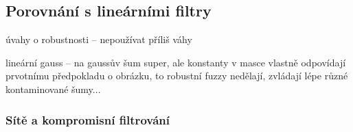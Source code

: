         
    \subsection{Porovnání s lineárními filtry}
    
        úvahy o robustnosti -- nepoužívat příliš váhy
        
        lineární gauss -- na gaussův šum super, ale konstanty v masce vlastně odpovídají prvotnímu předpokladu o obrázku, to robustní fuzzy nedělají, zvládají lépe různé kontaminované šumy... 

        
        
        \subsubsection{Sítě a kompromisní filtrování}




